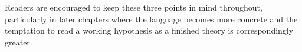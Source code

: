 \documentclass[11pt,oneside]{book}
\begin{document}
\bigskip
\noindent Readers are encouraged to keep these three points in mind
throughout, particularly in later chapters where the language becomes more
concrete and the temptation to read a working hypothesis as a finished
theory is correspondingly greater.

\tableofcontents

\mainmatter


\end{document}
